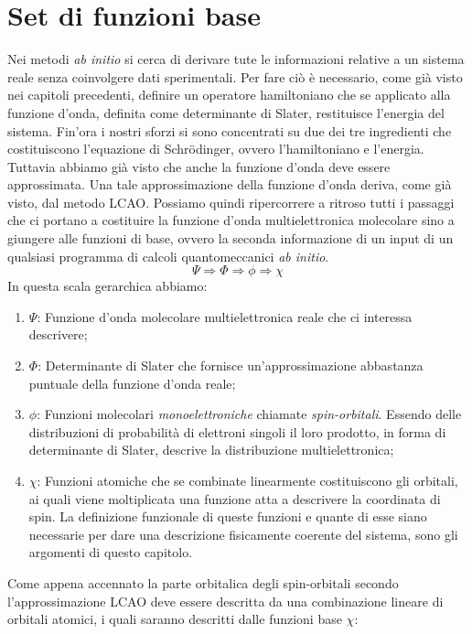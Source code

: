 \documentclass[oneside]{amsbook}
\numberwithin{section}{chapter}
\numberwithin{equation}{section}
\numberwithin{figure}{section}
\begin{document}
\chapter{Set di funzioni base}
Nei metodi \emph{ab initio} si cerca di derivare tute le informazioni relative a un sistema reale senza coinvolgere dati sperimentali. Per fare ciò è necessario, come già visto nei capitoli precedenti, definire un operatore hamiltoniano che se applicato alla funzione d'onda, definita come determinante di Slater, restituisce l'energia del sistema. Fin'ora i nostri sforzi si sono concentrati su due dei tre ingredienti che costituiscono l'equazione di Schr\"odinger, ovvero l'hamiltoniano e l'energia. Tuttavia abbiamo già visto che anche la funzione d'onda deve essere approssimata. Una tale approssimazione della funzione d'onda deriva, come già visto, dal metodo LCAO. Possiamo quindi ripercorrere a ritroso tutti i passaggi che ci portano a costituire la funzione d'onda multielettronica molecolare sino a giungere alle funzioni di base, ovvero la seconda informazione di un input di un qualsiasi programma di calcoli quantomeccanici \emph{ab initio}.
\begin{equation}
\Psi\Longrightarrow\Phi\Longrightarrow\phi\Longrightarrow\chi
\end{equation} 
In questa scala gerarchica abbiamo:
\begin{enumerate}
\item $\Psi$: Funzione d'onda molecolare multielettronica reale che ci interessa descrivere;
\item $\Phi$: Determinante di Slater che fornisce un'approssimazione abbastanza puntuale della funzione d'onda reale;
\item $\phi$: Funzioni molecolari \emph{monoelettroniche} chiamate \emph{spin-orbitali}. Essendo delle distribuzioni di probabilità di elettroni singoli il loro prodotto, in forma di determinante di Slater, descrive la distribuzione multielettronica;
\item $\chi$: Funzioni atomiche che se combinate linearmente costituiscono gli orbitali, ai quali viene moltiplicata una funzione atta a descrivere la coordinata di spin. La definizione funzionale di queste funzioni e quante di esse siano necessarie per dare una descrizione fisicamente coerente del sistema, sono gli argomenti di questo capitolo. 
\end{enumerate}
Come appena accennato la parte orbitalica degli spin-orbitali secondo l'approssimazione LCAO deve essere descritta da una combinazione lineare di orbitali atomici, i quali saranno descritti dalle funzioni base $\chi$:
\end{document}
